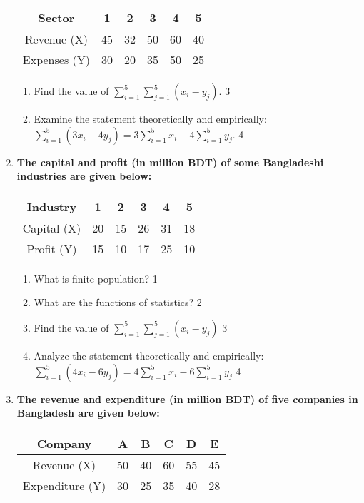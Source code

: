 \documentclass[a4paper,oneside]{book}
\begin{document}
\begin{enumerate}
\begin{table}[h]
\centering
\begin{tabular}{c|ccccc}
Sector & 1 & 2 & 3 & 4 & 5 \\ \hline
Revenue (X) & 45 & 32 & 50 & 60 & 40 \\ \hline
Expenses (Y) & 30 & 20 & 35 & 50 & 25
\end{tabular}
\end{table}

\begin{enumerate}
    \item  
    Find the value of $\displaystyle \sum_{i=1}^5 \sum_{j=1}^5 (x_i - y_j)$. \hfill 3
    \item
    Examine the statement theoretically and empirically:  $\displaystyle \sum_{i=1}^5 (3x_i - 4y_j) = 3 \sum_{i=1}^5 x_i - 4 \sum_{i=1}^5 y_j$. \hfill 4
\end{enumerate}


   \item
	  \textbf{The capital and profit (in million BDT) of some Bangladeshi 
	  industries are given below:}
	  
	  \begin{table}[h]
	  \centering
\begin{tabular}{c|ccccc}
Industry & 1 & 2 & 3 & 4 & 5 \\ \hline
Capital (X) & 20 & 15 & 26 & 31 & 18 \\ \hline
Profit (Y) & 15 & 10 & 17 & 25 & 10
\end{tabular}
\end{table}
  
  \begin{enumerate}
    \item
	What is finite population? \hfill 1
    \item
	What are the functions of statistics? \hfill 2
    \item  
	Find the value of $\displaystyle \sum_{i=1}^5 \sum_{j=1}^5 (x_i - y_j)$ \hfill 3
    \item
	Analyze the statement theoretically and empirically:  $\displaystyle \sum_{i=1}^5 (4x_i-6y_j) = 4 \sum_{i=1}^5 x_i - 6 \sum_{i=1}^5 y_j $ \hfill 4
  \end{enumerate}
  
  \item  
	  \textbf{The revenue and expenditure (in million BDT) of five companies in Bangladesh are given below:}  
	  
	  \begin{table}[h]
	  \centering
\begin{tabular}{c|ccccc}
Company & A & B & C & D & E \\ \hline
Revenue (X) & 50 & 40 & 60 & 55 & 45 \\ \hline
Expenditure (Y) & 30 & 25 & 35 & 40 & 28
\end{tabular}
\end{table}
  

\end{enumerate}
\end{document}
